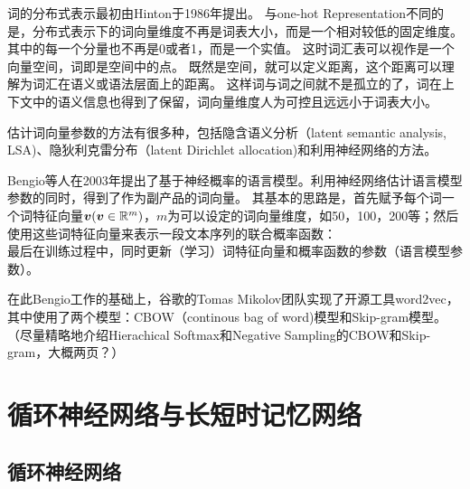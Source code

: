 词的分布式表示最初由Hinton于1986年提出。
与one-hot Representation不同的是，分布式表示下的词向量维度不再是词表大小，而是一个相对较低的固定维度。其中的每一个分量也不再是0或者1，而是一个实值。
这时词汇表可以视作是一个向量空间，词即是空间中的点。
既然是空间，就可以定义距离，这个距离可以理解为词汇在语义或语法层面上的距离。
这样词与词之间就不是孤立的了，词在上下文中的语义信息也得到了保留，词向量维度人为可控且远远小于词表大小。

估计词向量参数的方法有很多种，包括隐含语义分析（latent semantic analysis, LSA)、隐狄利克雷分布（latent Dirichlet allocation)和利用神经网络的方法。

Bengio等人在2003年提出了基于神经概率的语言模型。利用神经网络估计语言模型参数的同时，得到了作为副产品的词向量。
其基本的思路是，首先赋予每个词一个词特征向量$\boldsymbol{v}(\boldsymbol{v}\in \mathbb{R}^m)$，$m$为可以设定的词向量维度，如50，100，200等；然后使用这些词特征向量来表示一段文本序列的联合概率函数：
\begin{equation}
    
\end{equation}
最后在训练过程中，同时更新（学习）词特征向量和概率函数的参数（语言模型参数）。

在此Bengio工作的基础上，谷歌的Tomas Mikolov团队实现了开源工具word2vec，其中使用了两个模型：CBOW（continous bag of word)模型和Skip-gram模型。
（尽量精略地介绍Hierachical Softmax和Negative Sampling的CBOW和Skip-gram，大概两页？）
\section{循环神经网络与长短时记忆网络}

\subsection{循环神经网络}
